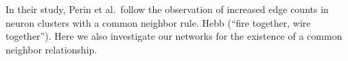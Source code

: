 In their study, Perin et al.\ follow the observation of increased edge
counts in neuron clusters with a common neighbor rule. Hebb
(\enquote{fire together, wire together}). Here we also investigate our
networks for the existence of a common neighbor relationship. 







